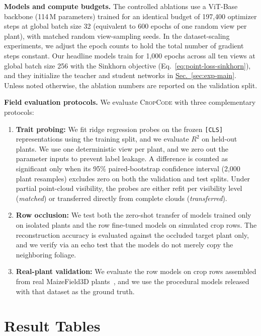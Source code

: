 \documentclass[10pt,twocolumn,letterpaper]{article}
\newcommand{\secref}[1]{\hyperref[#1]{Sec.~\ref*{#1}}}
\newcommand{\method}{\textup{\textsc{CropCode}}}   %
\begin{document}
\noindent\textbf{Models and compute budgets.}
The controlled ablations use a ViT-Base backbone (114\,M parameters) trained for an identical budget of 197{,}400 optimizer steps at global batch size 32 (equivalent to 600 epochs of one random view per plant), with matched random view-sampling seeds. In the dataset-scaling experiments, we adjust the epoch counts to hold the total number of gradient steps constant. Our headline models train for 1{,}000 epochs across all ten views at global batch size 256 with the Sinkhorn objective (Eq.~\ref{eq:point-loss-sinkhorn}), and they initialize the teacher and student networks in \secref{sec:exp-main}. Unless noted otherwise, the ablation numbers are reported on the validation split.

\noindent\textbf{Field evaluation protocols.}
We evaluate \method{} with three complementary protocols:
\begin{enumerate}
  \item \textbf{Trait probing:} We fit ridge regression probes on the frozen \texttt{[CLS]} representations using the training split, and we evaluate $R^2$ on held-out plants. We use one deterministic view per plant, and we zero out the parameter inputs to prevent label leakage. A difference is counted as significant only when its 95\% paired-bootstrap confidence interval (2{,}000 plant resamples) excludes zero on both the validation and test splits. Under partial point-cloud visibility, the probes are either refit per visibility level (\emph{matched}) or transferred directly from complete clouds (\emph{transferred}).
  \item \textbf{Row occlusion:} We test both the zero-shot transfer of models trained only on isolated plants and the row fine-tuned models on simulated crop rows. The reconstruction accuracy is evaluated against the occluded target plant only, and we verify via an echo test that the models do not merely copy the neighboring foliage.
  \item \textbf{Real-plant validation:} We evaluate the row models on crop rows assembled from real MaizeField3D plants~\citep{maizefield3d2025}, and we use the procedural models released with that dataset as the ground truth.
\end{enumerate}

\section{Result Tables}
\label{app:tables}
\end{document}
